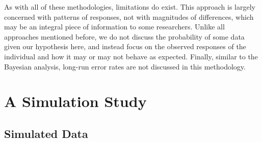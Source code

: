 \documentclass[,man, mask]{apa6}
\theoremstyle{definition}
\theoremstyle{definition}
\theoremstyle{definition}
\theoremstyle{remark}
\begin{document}
As with all of these methodologies, limitations do exist. This approach
is largely concerned with patterns of responses, not with magnitudes of
differences, which may be an integral piece of information to some
researchers. Unlike all approaches mentioned before, we do not discuss
the probability of some data given our hypothesis here, and instead
focus on the observed responses of the individual and how it may or may
not behave as expected. Finally, similar to the Bayesian analysis,
long-run error rates are not discussed in this methodology.

\section{A Simulation Study}\label{a-simulation-study}

\subsection{Simulated Data}\label{simulated-data}
\end{document}
